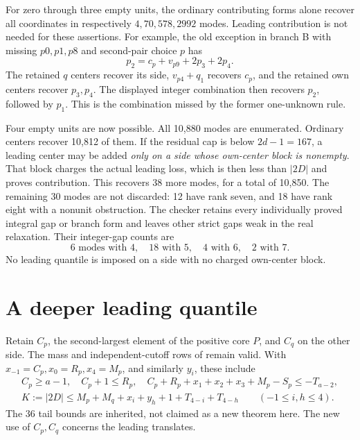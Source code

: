 \documentclass[11pt,a4paper]{article}
\begin{document}
For zero through three empty units, the ordinary contributing forms
alone recover all coordinates in respectively $4,70,578,2992$ modes.
Leading contribution is not needed for these assertions. For example,
the old exception in branch B with missing $p0,p1,p8$ and second-pair
choice $p$ has
\[
 p_2=c_p+v_{p9}+2p_3+2p_4.
\]
The retained $q$ centers recover its side, $v_{p4}+q_1$ recovers $c_p$,
and the retained own centers recover $p_3,p_4$. The displayed integer
combination then recovers $p_2$, followed by $p_1$.
This is the combination missed by the former one-unknown rule.

Four empty units are now possible. All 10,880 modes are enumerated.
Ordinary centers recover 10,812 of them. If the residual cap is below
$2d-1=167$, a leading center may be added \emph{only on a side whose
own-center block is nonempty}. That block charges the actual leading
loss, which is then less than $|2D|$ and proves contribution.
This recovers 38 more modes, for a total of 10,850.
The remaining 30 modes are not discarded: 12 have rank seven, and 18
have rank eight with a nonunit obstruction. The checker retains every
individually proved integral gap or branch form and leaves other strict
gaps weak in the real relaxation. Their integer-gap counts are
\[
 6\text{ modes with }4,\quad18\text{ with }5,\quad
 4\text{ with }6,\quad2\text{ with }7.
\]
No leading quantile is imposed on a side with no charged own-center block.

\section{A deeper leading quantile}
Retain $C_p$, the second-largest element of the positive core $P$, and
$C_q$ on the other side. The mass and independent-cutoff rows of
\cite{previous} remain valid. With
$x_{-1}=C_p,x_0=R_p,x_4=M_p$, and similarly $y_i$, these include
\begin{gather*}
 C_p\ge a-1,\quad C_p+1\le R_p,\quad
 C_p+R_p+x_1+x_2+x_3+M_p-S_p\le-T_{a-2},\\
 K:=|2D|\le M_p+M_q+x_i+y_h+1+T_{4-i}+T_{4-h}
 \qquad(-1\le i,h\le4).
\end{gather*}
The 36 tail bounds are inherited, not claimed as a new theorem here.
The new use of $C_p,C_q$ concerns the leading translates.
\end{document}
